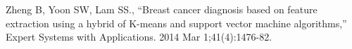 \documentclass[conference]{IEEEtran}
\begin{document}
\begin{thebibliography}{00}
% 
 Zheng B, Yoon SW, Lam SS., ``Breast cancer diagnosis based on feature extraction using a hybrid of K-means and support vector machine algorithms,'' Expert Systems with Applications. 2014 Mar 1;41(4):1476-82.


\end{thebibliography}
\end{document}

